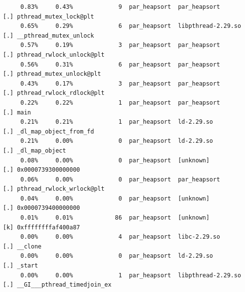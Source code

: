 \documentclass{article}
\begin{document}
\begin{verbatim}
     0.83%     0.43%             9  par_heapsort  par_heapsort        [.] pthread_mutex_lock@plt
     0.65%     0.29%             6  par_heapsort  libpthread-2.29.so  [.] __pthread_mutex_unlock
     0.57%     0.19%             3  par_heapsort  par_heapsort        [.] pthread_rwlock_unlock@plt
     0.56%     0.31%             6  par_heapsort  par_heapsort        [.] pthread_mutex_unlock@plt
     0.43%     0.17%             3  par_heapsort  par_heapsort        [.] pthread_rwlock_rdlock@plt
     0.22%     0.22%             1  par_heapsort  par_heapsort        [.] main
     0.21%     0.21%             1  par_heapsort  ld-2.29.so          [.] _dl_map_object_from_fd
     0.21%     0.00%             0  par_heapsort  ld-2.29.so          [.] _dl_map_object
     0.08%     0.00%             0  par_heapsort  [unknown]           [.] 0x0000739300000000
     0.06%     0.00%             0  par_heapsort  par_heapsort        [.] pthread_rwlock_wrlock@plt
     0.04%     0.00%             0  par_heapsort  [unknown]           [.] 0x0000739400000000
     0.01%     0.01%            86  par_heapsort  [unknown]           [k] 0xffffffffaf400a87
     0.00%     0.00%             4  par_heapsort  libc-2.29.so        [.] __clone
     0.00%     0.00%             0  par_heapsort  ld-2.29.so          [.] _start
     0.00%     0.00%             1  par_heapsort  libpthread-2.29.so  [.] __GI___pthread_timedjoin_ex
\end{verbatim}
\normalsize
\end{document}
